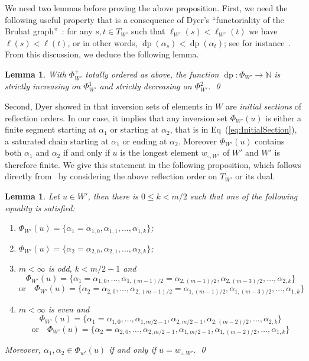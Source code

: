 \documentclass{amsart}
\newtheorem{Lemma}[Theorem]{Lemma}
\theoremstyle{definition}
\newcommand{\dep}{\operatorname{dp}}
\begin{document}
  
We need two lemmas before proving the above proposition. First, we need the following useful property that is a consequence of Dyer's ``functoriality of the Bruhat graph''~\cite{Dy91}: for any $s,t\in T_{W'}$ such that $\ell_{W'}(s)< \ell_{W'}(t)$ we have $\ell(s)< \ell(t)$, or in other words, $\dep(\alpha_s)<\dep(\alpha_t)$; see for instance~\cite[\S2.8-Eq.(4)]{DFHM24}. From this discussion, we deduce the following lemma. 

\begin{Lemma}\label{lem:DepthDi} With $\Phi_{W'}^+$ totally ordered as above, the function $\dep:\Phi_{W'}\to \mathbb N$ is strictly increasing on $\Phi_{W'}^1$ and strictly decreasing on $\Phi_{W'}^2$. \qed
\end{Lemma}


Second, Dyer showed in \cite{Dy92} that inversion sets of elements in $W$ are {\em initial sections} of reflection orders. In our case,  it implies that any inversion set $\Phi_{W'}(u)$ is either a finite segment starting at $\alpha_1$ or starting at $\alpha_2$, that is in Eq~(\ref{eq:InitialSection}), a saturated chain starting at $\alpha_1$ or ending at $\alpha_2$. Moreover $\Phi_{W'}(u)$ contains  both $\alpha_1$ and $\alpha_2$  if and only if $u$ is the longest element $w_{\circ,W'}$ of $W'$ and $W'$ is therefore finite. We give this statement in the following proposition, which follows directly from~\cite[Definition~2.1~\&~Lemma~2.11]{Dy92} by considering the above reflection order on $T_{W'}$ or its dual.
 

\begin{Lemma}\label{lem:InvDi} Let $u\in W'$, then there is $0\leq k< m/2$ such that one of the following equality is satisfied:  
\begin{enumerate} 
\item $\Phi_{W'}(u)=\{\alpha_1=\alpha_{1,0},\alpha_{1,1}, \dots , \alpha_{1,k} \}$;
\item $\Phi_{W'}(u)=\{\alpha_2=\alpha_{2,0},\alpha_{2,1}, \dots , \alpha_{2,k} \}$;
\item $m<\infty$ is odd, $k<m/2-1$ and 
$$
\Phi_{W'}(u)=\{\alpha_1=\alpha_{1,0}, \dots , \alpha_{1,(m-1)/2}=\alpha_{2,(m-1)/2},\alpha_{2,(m-3)/2},\dots ,\alpha_{2,k} \} 
$$
$$
\textrm{or}\quad \Phi_{W'}(u)=\{\alpha_2=\alpha_{2,0}, \dots , \alpha_{2,(m-1)/2}=\alpha_{1,(m-1)/2},\alpha_{1,(m-3)/2},\dots ,\alpha_{1,k} \} 
$$

\item $m<\infty$ is even and 
$$
\Phi_{W'}(u)=\{\alpha_1=\alpha_{1,0}, \dots , \alpha_{1,m/2-1},\alpha_{2,m/2-1},\alpha_{2,(m-2)/2},\dots ,\alpha_{2,k} \} 
$$
$$
\textrm{or}\quad \Phi_{W'}(u)=\{\alpha_2=\alpha_{2,0}, \dots , \alpha_{2,m/2-1},\alpha_{1,m/2-1},\alpha_{1,(m-2)/2},\dots ,\alpha_{1,k} \} 
$$
\end{enumerate}
Moreover, $\alpha_1,\alpha_2\in \Phi_{w'}(u)$ if and only if $u=w_{\circ,W'}$. \qed
\end{Lemma}
\end{document}
